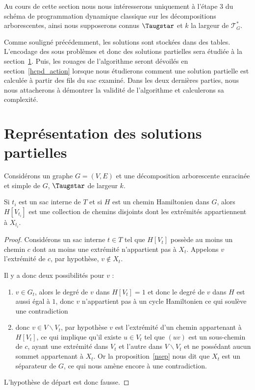 
Au cours de cette section nous nous intéresserons uniquement à l'étape $3$ du schéma de programmation
dynamique classique sur les décompositions arborescentes, ainsi nous supposerons connus $\Taugstar$
et $k$ la largeur de $\mathcal{T}_G^*$.

Comme souligné précédemment, les solutions sont stockées dans des tables. L'encodage des sous
problèmes et donc des solutions partielles sera étudiée à la section~\ref{hcpd_table}. Puis, les
rouages de l'algorithme seront dévoilés en section~\ref{hcpd_action} lorsque nous étudierons comment
une solution partielle est calculée à partir des fils du sac examiné. Dans les deux dernières
parties, nous nous attacherons à démontrer la validité de l'algorithme et calculerons sa
complexité.

\section{Représentation des solutions partielles}
\label{hcpd_table}

Considérons un graphe $G=(V, E)$ et une décomposition arborescente enracinée et simple de $G$,
$\Taugstar$ de largeur $k$.
\begin{nlemma}
    Si $t_i$ est un sac interne de $T$ et si $H$ est un chemin Hamiltonien dans $G$, alors
    $H[V_{t_i}]$ est une collection de chemins disjoints dont les extrémités appartiennent à
    $X_{t_i}$.
\end{nlemma}

\begin{proof}
    Considérons un sac interne $t \in T$ tel que $H[V_t]$ possède au moins un chemin $c$ dont au moins
    une extrémité n'appartient pas à $X_t$. Appelons $v$ l'extrémité de $c$, par
    hypothèse, $v \not \in X_t$.

    Il y a donc deux possibilités pour $v$ :
    \begin{enumerate}
        \item $v \in G_t$, alors le degré de $v$ dans $H[V_t] = 1$ et donc le degré de $v$ dans $H$
            est aussi égal à $1$, donc $v$ n'appartient pas à un cycle Hamiltonien ce qui soulève une
            contradiction
        \item donc $v \in V\backslash V_t$, par hypothèse $v$ est l'extrémité d'un chemin appartenant à
            $H[V_t]$, ce qui implique qu'il existe $u \in V_t$ tel que $(uv)$ est un sous-chemin de
            $c$, ayant une extrémité dans $V_t$ et l'autre dans $V\backslash V_t$ et ne possédant aucun
            sommet appartenant à $X_t$. Or la proposition~\ref{nsep} nous dit que $X_t$ est un
            séparateur de $G$, ce qui nous amène encore à une contradiction.
    \end{enumerate}
    L'hypothèse de départ est donc fausse.
\end{proof}

